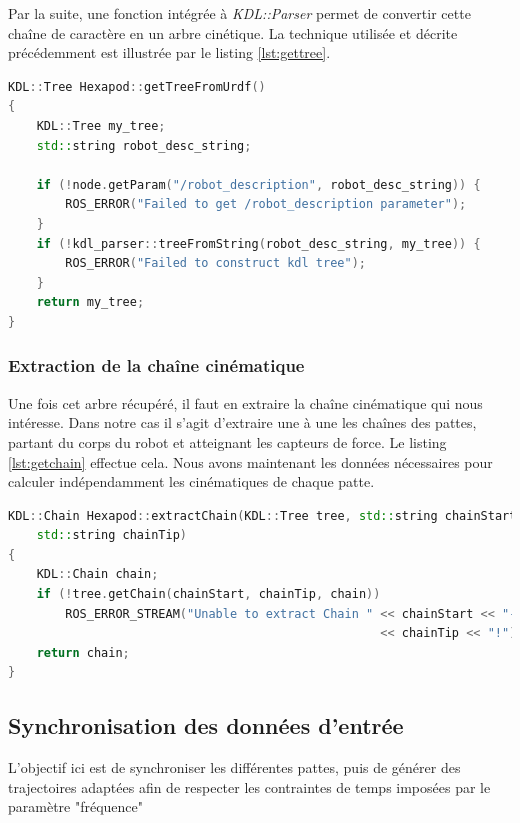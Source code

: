 \documentclass{tnreport}
\begin{document}
Par la suite, une fonction intégrée à \textit{KDL::Parser} permet de convertir cette chaîne de caractère en un arbre cinétique. La technique utilisée et décrite précédemment est illustrée par le listing \ref{lst:gettree}.

\newpage
\begin{lstlisting}[language=c++,caption={Récupération de l'arbre cinématique depuis robot\_description }, label={lst:gettree}]
KDL::Tree Hexapod::getTreeFromUrdf()
{
    KDL::Tree my_tree;
    std::string robot_desc_string;

    if (!node.getParam("/robot_description", robot_desc_string)) {
        ROS_ERROR("Failed to get /robot_description parameter");
    }
    if (!kdl_parser::treeFromString(robot_desc_string, my_tree)) {
        ROS_ERROR("Failed to construct kdl tree");
    }
    return my_tree;
}
\end{lstlisting}
\subsubsection{Extraction de la chaîne cinématique}

Une fois cet arbre récupéré, il faut en extraire la chaîne cinématique qui nous intéresse. Dans notre cas il s'agit d'extraire une à une les chaînes des pattes, partant du corps du robot et atteignant les capteurs de force. Le listing \ref{lst:getchain} effectue cela. Nous avons maintenant les données nécessaires pour calculer indépendamment les cinématiques de chaque patte.

\begin{lstlisting}[language=c++,caption={Extraction de la chaîne cinématique}, label={lst:getchain}]
 KDL::Chain Hexapod::extractChain(KDL::Tree tree, std::string chainStart,
    std::string chainTip)
{
    KDL::Chain chain;
    if (!tree.getChain(chainStart, chainTip, chain))
        ROS_ERROR_STREAM("Unable to extract Chain " << chainStart << "-->"
                                                    << chainTip << "!");
    return chain;
}
\end{lstlisting}

\subsection{Synchronisation des données d'entrée}
L'objectif ici est de synchroniser les différentes pattes, puis de générer des trajectoires adaptées afin de respecter les contraintes de temps imposées par le paramètre "fréquence"
\end{document}
